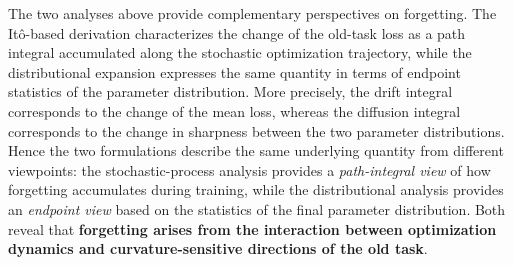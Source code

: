\documentclass{article}
\begin{document}



The two analyses above provide complementary perspectives on forgetting.
The Itô-based derivation characterizes the change of the old-task loss as a path integral accumulated along the stochastic optimization trajectory, while the distributional expansion expresses the same quantity in terms of endpoint statistics of the parameter distribution.
More precisely, the drift integral corresponds to the change of the mean loss, whereas the diffusion integral corresponds to the change in sharpness between the two parameter distributions.
Hence the two formulations describe the same underlying quantity from different viewpoints: the stochastic-process analysis provides a \emph{path-integral view} of how forgetting accumulates during training, while the distributional analysis provides an \emph{endpoint view} based on the statistics of the final parameter distribution.
Both reveal that \textbf{forgetting arises from the interaction between optimization dynamics and curvature-sensitive directions of the old task}.
\end{document}
